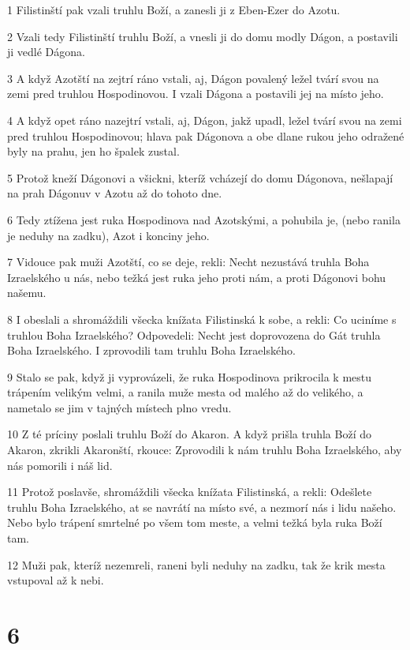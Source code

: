 \par 1 Filistinští pak vzali truhlu Boží, a zanesli ji z Eben-Ezer do Azotu.
\par 2 Vzali tedy Filistinští truhlu Boží, a vnesli ji do domu modly Dágon, a postavili ji vedlé Dágona.
\par 3 A když Azotští na zejtrí ráno vstali, aj, Dágon povalený ležel tvárí svou na zemi pred truhlou Hospodinovou. I vzali Dágona a postavili jej na místo jeho.
\par 4 A když opet ráno nazejtrí vstali, aj, Dágon, jakž upadl, ležel tvárí svou na zemi pred truhlou Hospodinovou; hlava pak Dágonova a obe dlane rukou jeho odražené byly na prahu, jen ho špalek zustal.
\par 5 Protož kneží Dágonovi a všickni, kteríž vcházejí do domu Dágonova, nešlapají na prah Dágonuv v Azotu až do tohoto dne.
\par 6 Tedy ztížena jest ruka Hospodinova nad Azotskými, a pohubila je, (nebo ranila je neduhy na zadku), Azot i konciny jeho.
\par 7 Vidouce pak muži Azotští, co se deje, rekli: Necht nezustává truhla Boha Izraelského u nás, nebo težká jest ruka jeho proti nám, a proti Dágonovi bohu našemu.
\par 8 I obeslali a shromáždili všecka knížata Filistinská k sobe, a rekli: Co uciníme s truhlou Boha Izraelského? Odpovedeli: Necht jest doprovozena do Gát truhla Boha Izraelského. I zprovodili tam truhlu Boha Izraelského.
\par 9 Stalo se pak, když ji vyprovázeli, že ruka Hospodinova prikrocila k mestu trápením velikým velmi, a ranila muže mesta od malého až do velikého, a nametalo se jim v tajných místech plno vredu.
\par 10 Z té príciny poslali truhlu Boží do Akaron. A když prišla truhla Boží do Akaron, zkrikli Akaronští, rkouce: Zprovodili k nám truhlu Boha Izraelského, aby nás pomorili i náš lid.
\par 11 Protož poslavše, shromáždili všecka knížata Filistinská, a rekli: Odešlete truhlu Boha Izraelského, at se navrátí na místo své, a nezmorí nás i lidu našeho. Nebo bylo trápení smrtelné po všem tom meste, a velmi težká byla ruka Boží tam.
\par 12 Muži pak, kteríž nezemreli, raneni byli neduhy na zadku, tak že krik mesta vstupoval až k nebi.

\chapter{6}

